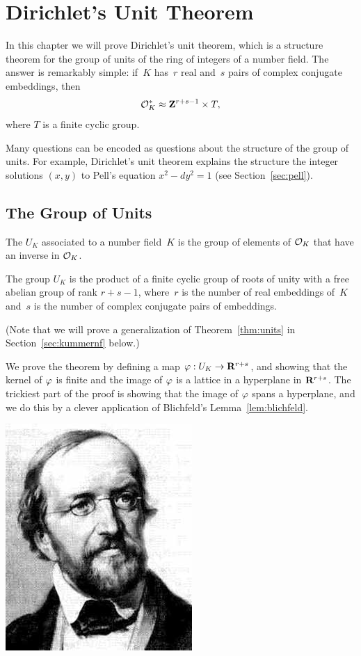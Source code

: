 \chapter{Dirichlet's Unit Theorem}
In this chapter we will prove Dirichlet's unit theorem, 
which is a structure theorem for the group
of units of the ring of integers of a number field.  The answer is
remarkably simple: if~$K$ has~$r$ real and~$s$ pairs of
complex conjugate embeddings,
then 
$$
\mathcal{O}_K^*\approx \mathbf{Z}^{r+s-1} \times T,
$$
where $T$ is a finite cyclic group.

Many questions can be encoded as questions about the structure of the
group of units.  For example, Dirichlet's unit theorem explains
the structure the  integer solutions $(x,y)$ to Pell's equation $x^2-dy^2=1$
(see Section~\ref{sec:pell}).


\section{The Group of Units}
\begin{definition}
The  $U_K$ associated to a number field~$K$ is the
group of elements of $\mathcal{O}_K$ that have an inverse in $\mathcal{O}_K$.
\end{definition}

\begin{theorem}[Dirichlet]\label{thm:units}
The group $U_K$ is the product of a finite cyclic group of roots of
unity with a free abelian group of rank $r+s-1$, where~$r$ is the
number of real embeddings of~$K$ and~$s$ is the number of complex
conjugate pairs of embeddings.
\end{theorem}
(Note that we will prove a generalization of Theorem~\ref{thm:units} in
Section~\ref{sec:kummernf} below.)

We prove the theorem by defining a map $\varphi:U_K\to \mathbf{R}^{r+s}$, and
showing that the kernel of $\varphi$ is finite and the image of $\varphi$
is a lattice in a hyperplane in $\mathbf{R}^{r+s}$.  The trickiest part of the
proof is showing that the image of $\varphi$ spans a hyperplane, and we
do this by a clever application of Blichfeld's Lemma~\ref{lem:blichfeld}.

\begin{center}
\includegraphics[width=.3\textwidth]{graphics/dirichlet}
\end{center}

